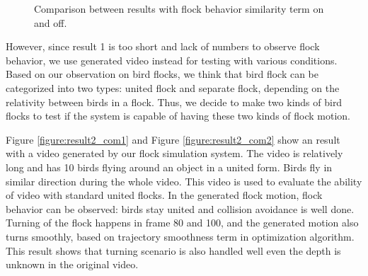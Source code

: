 \begin{figure}[h]
\begin{center}
\hspace{\fill}


\hspace{\fill}
\end{center}
\caption{Comparison between results with flock behavior similarity term on and off.}
\label{figure:collide}
\end{figure}


However, since result 1 is too short and lack of numbers to observe flock behavior, we use generated video instead for testing with various conditions. Based on our observation on bird flocks, we think that bird flock can be categorized into two types: united flock and separate flock, depending on the relativity between birds in a flock. Thus, we decide to make two kinds of bird flocks to test if the system is capable of having these two kinds of flock motion.


Figure \ref{figure:result2_com1} and Figure \ref{figure:result2_com2} show an result with a video generated by our flock simulation system. The video is relatively long and has 10 birds flying around an object in a united form. Birds fly in similar direction during the whole video. This video is used to evaluate the ability of video with standard united flocks. In the generated flock motion, flock behavior can be observed: birds stay united and collision avoidance is well done. Turning of the flock happens in frame 80 and 100, and the generated motion also turns smoothly, based on trajectory smoothness term in optimization algorithm. This result shows that turning scenario is also handled well even the depth is unknown in the original video.


